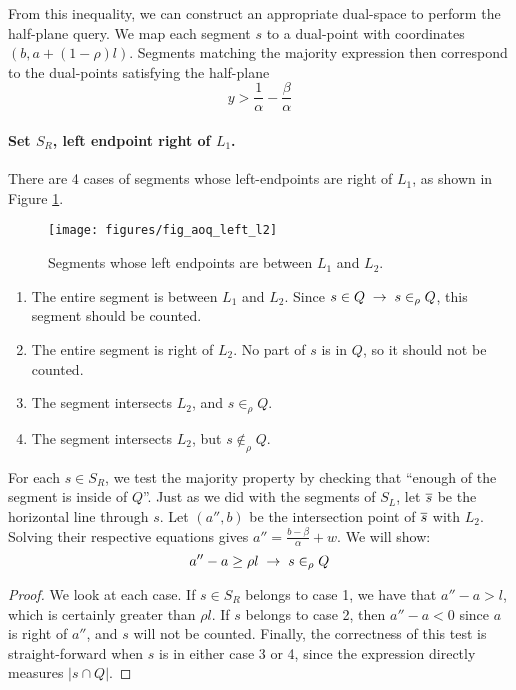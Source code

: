 From this inequality, we can construct an appropriate dual-space to perform the half-plane query. We map each segment $s$ to a dual-point with coordinates $(b, a + (1-\rho)l)$. Segments matching the majority expression then correspond to the dual-points satisfying the half-plane
\[
y > \frac{1}{\alpha} - \frac{\beta}{\alpha}
\]


\paragraph{Set $S_R$, left endpoint right of $L_1$.}
There are 4 cases of segments whose left-endpoints are right of $L_1$, as shown in Figure \ref{fig:slabs:one:aoq_left_l2}.

\begin{figure}[t]
\begin{center}
  \texttt{[image: figures/fig\_aoq\_left\_l2]}
  \caption{Segments whose left endpoints are between $L_1$ and $L_2$.}
  \label{fig:slabs:one:aoq_left_l2}
\end{center}
\end{figure}


\begin{enumerate}
 \item The entire segment is between $L_1$ and $L_2$. Since $s \in Q \;\rightarrow\; s \in_\rho Q$, this segment should be counted.

 \item The entire segment is right of $L_2$. No part of $s$ is in $Q$, so it should not be counted.

 \item The segment intersects $L_2$, and $s \in_\rho Q$.

 \item The segment intersects $L_2$, but $s \not \in_\rho Q$.

\end{enumerate}

For each $s \in S_R$, we test the majority property by checking that ``enough of the segment is inside of $Q$''.  Just as we did with the segments of $S_L$, let $\overline{s}$ be the horizontal line through $s$.  Let $(a'', b)$ be the intersection point of $\overline{s}$ with $L_2$. Solving their respective equations gives $a'' = \frac{b - \beta}{\alpha} + w$.  We will show:
\[
a'' - a \geq \rho l \;\rightarrow\; s \in_\rho Q
\]

\begin{proof}
We look at each case. 
If $s \in S_R$ belongs to case 1, we have that $a'' - a > l$, which is certainly greater than $\rho l$. 
If $s$ belongs to case 2, then $a'' - a < 0$ since $a$ is right of $a''$, and $s$ will not be counted.
Finally, the correctness of this test is straight-forward when $s$ is in either case 3 or 4, since the expression directly measures $|s \cap Q|$.
\end{proof}

